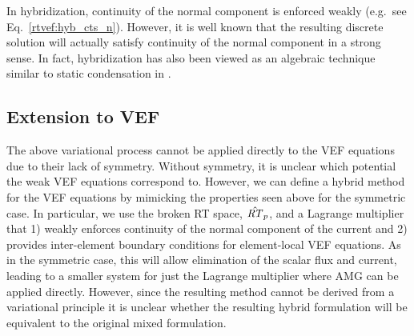 \documentclass[../doc.tex]{subfiles}
\begin{document}
In hybridization, continuity of the normal component is enforced weakly (e.g.~see Eq.~\ref{rtvef:hyb_cts_n}). However, it is well known that the resulting discrete solution will actually satisfy continuity of the normal component in a strong sense. In fact, hybridization has also been viewed as an algebraic technique similar to static condensation in \cite{doi:10.1137/17M1132562}. 

\subsection{Extension to VEF}
The above variational process cannot be applied directly to the VEF equations due to their lack of symmetry. Without symmetry, it is unclear which potential the weak VEF equations correspond to. However, we can define a hybrid method for the VEF equations by mimicking the properties seen above for the symmetric case. In particular, we use the broken RT space, $\hat{\mathit{RT}}_p$, and a Lagrange multiplier that 1) weakly enforces continuity of the normal component of the current and 2) provides inter-element boundary conditions for element-local VEF equations. As in the symmetric case, this will allow elimination of the scalar flux and current, leading to a smaller system for just the Lagrange multiplier where AMG can be applied directly. However, since the resulting method cannot be derived from a variational principle it is unclear whether the resulting hybrid formulation will be equivalent to the original mixed formulation. 
\end{document}
